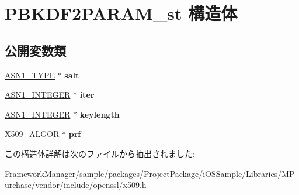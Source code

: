 \hypertarget{struct_p_b_k_d_f2_p_a_r_a_m__st}{}\section{P\+B\+K\+D\+F2\+P\+A\+R\+A\+M\+\_\+st 構造体}
\label{struct_p_b_k_d_f2_p_a_r_a_m__st}
\subsection*{公開変数類}
\begin{DoxyCompactItemize}
\item 
\hypertarget{struct_p_b_k_d_f2_p_a_r_a_m__st_aa81f35e6d5ec790f7265b17be3a6d163}{}\hyperlink{structasn1__type__st}{A\+S\+N1\+\_\+\+T\+Y\+P\+E} $\ast$ {\bfseries salt}\label{struct_p_b_k_d_f2_p_a_r_a_m__st_aa81f35e6d5ec790f7265b17be3a6d163}

\item 
\hypertarget{struct_p_b_k_d_f2_p_a_r_a_m__st_a8ff00adf7617aa97d36fdd4b6fdbaf0f}{}\hyperlink{structasn1__string__st}{A\+S\+N1\+\_\+\+I\+N\+T\+E\+G\+E\+R} $\ast$ {\bfseries iter}\label{struct_p_b_k_d_f2_p_a_r_a_m__st_a8ff00adf7617aa97d36fdd4b6fdbaf0f}

\item 
\hypertarget{struct_p_b_k_d_f2_p_a_r_a_m__st_a0d7609db9885ce6ab331668123b09a2c}{}\hyperlink{structasn1__string__st}{A\+S\+N1\+\_\+\+I\+N\+T\+E\+G\+E\+R} $\ast$ {\bfseries keylength}\label{struct_p_b_k_d_f2_p_a_r_a_m__st_a0d7609db9885ce6ab331668123b09a2c}

\item 
\hypertarget{struct_p_b_k_d_f2_p_a_r_a_m__st_ac2bdfe036b70c95d5b58e61c1b786fc1}{}\hyperlink{struct_x509__algor__st}{X509\+\_\+\+A\+L\+G\+O\+R} $\ast$ {\bfseries prf}\label{struct_p_b_k_d_f2_p_a_r_a_m__st_ac2bdfe036b70c95d5b58e61c1b786fc1}

\end{DoxyCompactItemize}


この構造体詳解は次のファイルから抽出されました\+:\begin{DoxyCompactItemize}
\item 
Framework\+Manager/sample/packages/\+Project\+Package/i\+O\+S\+Sample/\+Libraries/\+M\+Purchase/vendor/include/openssl/x509.\+h\end{DoxyCompactItemize}
